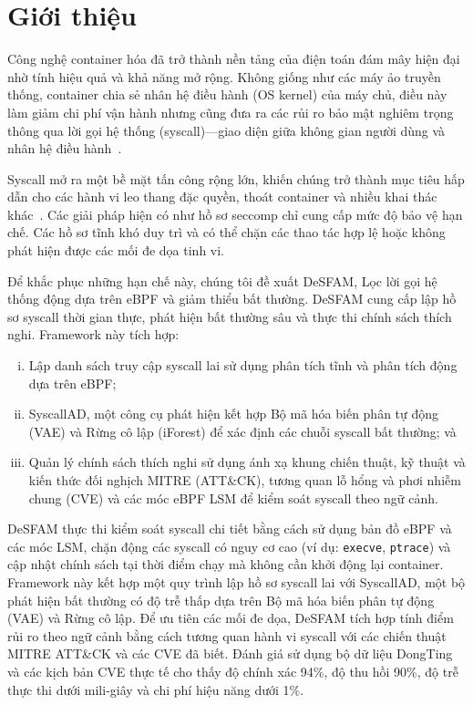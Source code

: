 \section{Giới thiệu}
\label{sec:intro}

Công nghệ container hóa đã trở thành nền tảng của điện toán đám mây hiện đại nhờ tính hiệu quả và khả năng mở rộng. Không giống như các máy ảo truyền thống, container chia sẻ nhân hệ điều hành (OS kernel) của máy chủ, điều này làm giảm chi phí vận hành nhưng cũng đưa ra các rủi ro bảo mật nghiêm trọng thông qua lời gọi hệ thống (syscall)---giao diện giữa không gian người dùng và nhân hệ điều hành~\cite{ref1_jarkas_survey,ref3_sultan_survey}.

Syscall mở ra một bề mặt tấn công rộng lớn, khiến chúng trở thành mục tiêu hấp dẫn cho các hành vi leo thang đặc quyền, thoát container và nhiều khai thác khác~\cite{ref5_combe_docker}. Các giải pháp hiện có như hồ sơ seccomp chỉ cung cấp mức độ bảo vệ hạn chế. Các hồ sơ tĩnh khó duy trì và có thể chặn các thao tác hợp lệ hoặc không phát hiện được các mối đe dọa tinh vi.

Để khắc phục những hạn chế này, chúng tôi đề xuất DeSFAM, Lọc lời gọi hệ thống động dựa trên eBPF và giảm thiểu bất thường. DeSFAM cung cấp lập hồ sơ syscall thời gian thực, phát hiện bất thường sâu và thực thi chính sách thích nghi. Framework này tích hợp:
\begin{enumerate}[(i)]
  \item Lập danh sách truy cập syscall lai sử dụng phân tích tĩnh và phân tích động dựa trên eBPF;
  \item SyscallAD, một công cụ phát hiện kết hợp Bộ mã hóa biến phân tự động (VAE) và Rừng cô lập
        (iForest) để xác định các chuỗi syscall bất thường; và
  \item Quản lý chính sách thích nghi sử dụng ánh xạ khung chiến thuật, kỹ thuật và kiến thức đối nghịch
        MITRE (ATT\&CK), tương quan lỗ hổng và phơi nhiễm chung (CVE) và các móc eBPF LSM để kiểm
        soát syscall theo ngữ cảnh.
\end{enumerate}

DeSFAM thực thi kiểm soát syscall chi tiết bằng cách sử dụng bản đồ eBPF và các móc LSM, chặn động các syscall có nguy cơ cao (ví dụ: \texttt{execve}, \texttt{ptrace}) và cập nhật chính sách tại thời điểm chạy mà không cần khởi động lại container. Framework này kết hợp một quy trình lập hồ sơ syscall lai với SyscallAD, một bộ phát hiện bất thường có độ trễ thấp dựa trên Bộ mã hóa biến phân tự động (VAE) và Rừng cô lập. Để ưu tiên các mối đe dọa, DeSFAM tích hợp tính điểm rủi ro theo ngữ cảnh bằng cách tương quan hành vi syscall với các chiến thuật MITRE ATT\&CK và các CVE đã biết. Đánh giá sử dụng bộ dữ liệu DongTing và các kịch bản CVE thực tế cho thấy độ chính xác 94\%, độ thu hồi 90\%, độ trễ thực thi dưới mili-giây và chi phí hiệu năng dưới 1\%.


